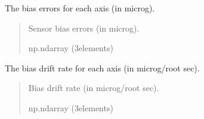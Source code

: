 \documentclass[letterpaper,10pt,english]{sphinxmanual}
\begin{document}
\begin{fulllineitems}
\begin{fulllineitems}
\label{\detokenize{modules/measurement/error_properties:qnav.measurement.error_properties.ErrorProperties.bias_error}}
\pysigstartsignatures
{}
\pysigstopsignatures
\sphinxAtStartPar
The bias errors for each axis (in micro\sphinxhyphen{}g).
\begin{quote}\begin{description}
\sphinxAtStartPar
Sensor bias errors (in micro\sphinxhyphen{}g).

\sphinxAtStartPar
np.ndarray (3\sphinxhyphen{}elements)

\end{description}\end{quote}

\end{fulllineitems}


\begin{fulllineitems}
\label{\detokenize{modules/measurement/error_properties:qnav.measurement.error_properties.ErrorProperties.bias_drift_rate}}
\pysigstartsignatures
{}
\pysigstopsignatures
\sphinxAtStartPar
The bias drift rate for each axis (in micro\sphinxhyphen{}g/root sec).
\begin{quote}\begin{description}
\sphinxAtStartPar
Bias drift rate (in micro\sphinxhyphen{}g/root sec).

\sphinxAtStartPar
np.ndarray (3\sphinxhyphen{}elements)

\end{description}\end{quote}

\end{fulllineitems}



\end{fulllineitems}
\end{document}
